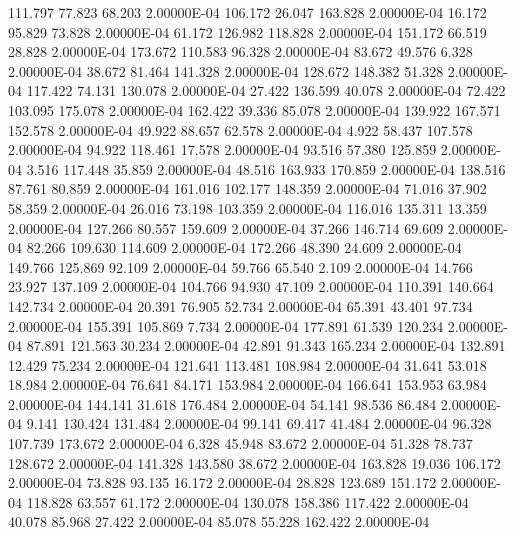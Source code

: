    111.797    77.823    68.203  2.00000E-04
   106.172    26.047   163.828  2.00000E-04
    16.172    95.829    73.828  2.00000E-04
    61.172   126.982   118.828  2.00000E-04
   151.172    66.519    28.828  2.00000E-04
   173.672   110.583    96.328  2.00000E-04
    83.672    49.576     6.328  2.00000E-04
    38.672    81.464   141.328  2.00000E-04
   128.672   148.382    51.328  2.00000E-04
   117.422    74.131   130.078  2.00000E-04
    27.422   136.599    40.078  2.00000E-04
    72.422   103.095   175.078  2.00000E-04
   162.422    39.336    85.078  2.00000E-04
   139.922   167.571   152.578  2.00000E-04
    49.922    88.657    62.578  2.00000E-04
     4.922    58.437   107.578  2.00000E-04
    94.922   118.461    17.578  2.00000E-04
    93.516    57.380   125.859  2.00000E-04
     3.516   117.448    35.859  2.00000E-04
    48.516   163.933   170.859  2.00000E-04
   138.516    87.761    80.859  2.00000E-04
   161.016   102.177   148.359  2.00000E-04
    71.016    37.902    58.359  2.00000E-04
    26.016    73.198   103.359  2.00000E-04
   116.016   135.311    13.359  2.00000E-04
   127.266    80.557   159.609  2.00000E-04
    37.266   146.714    69.609  2.00000E-04
    82.266   109.630   114.609  2.00000E-04
   172.266    48.390    24.609  2.00000E-04
   149.766   125.869    92.109  2.00000E-04
    59.766    65.540     2.109  2.00000E-04
    14.766    23.927   137.109  2.00000E-04
   104.766    94.930    47.109  2.00000E-04
   110.391   140.664   142.734  2.00000E-04
    20.391    76.905    52.734  2.00000E-04
    65.391    43.401    97.734  2.00000E-04
   155.391   105.869     7.734  2.00000E-04
   177.891    61.539   120.234  2.00000E-04
    87.891   121.563    30.234  2.00000E-04
    42.891    91.343   165.234  2.00000E-04
   132.891    12.429    75.234  2.00000E-04
   121.641   113.481   108.984  2.00000E-04
    31.641    53.018    18.984  2.00000E-04
    76.641    84.171   153.984  2.00000E-04
   166.641   153.953    63.984  2.00000E-04
   144.141    31.618   176.484  2.00000E-04
    54.141    98.536    86.484  2.00000E-04
     9.141   130.424   131.484  2.00000E-04
    99.141    69.417    41.484  2.00000E-04
    96.328   107.739   173.672  2.00000E-04
     6.328    45.948    83.672  2.00000E-04
    51.328    78.737   128.672  2.00000E-04
   141.328   143.580    38.672  2.00000E-04
   163.828    19.036   106.172  2.00000E-04
    73.828    93.135    16.172  2.00000E-04
    28.828   123.689   151.172  2.00000E-04
   118.828    63.557    61.172  2.00000E-04
   130.078   158.386   117.422  2.00000E-04
    40.078    85.968    27.422  2.00000E-04
    85.078    55.228   162.422  2.00000E-04
